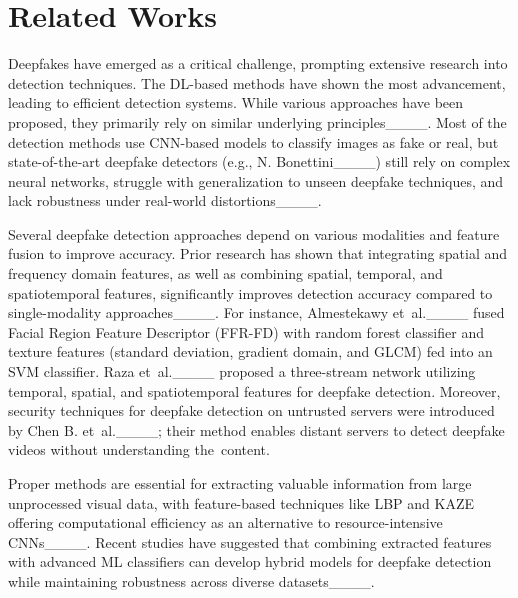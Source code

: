 \section{Related Works}
\label{sec:impact}

Deepfakes have emerged as a critical challenge, prompting extensive research into detection techniques. The DL-based methods have shown the most advancement, leading to efficient detection systems. While various approaches have been proposed, they primarily rely on similar underlying principles____. 
Most of the detection methods use CNN-based models to classify images as fake or real, but state-of-the-art deepfake detectors (e.g., N. Bonettini____) still rely on complex neural networks, struggle with generalization to unseen deepfake techniques, and lack robustness under real-world distortions____.

Several deepfake detection approaches depend on various modalities and feature fusion to improve accuracy. Prior research has shown that integrating spatial and frequency domain features, as well as combining spatial, temporal, and spatiotemporal features, significantly improves detection accuracy compared to single-modality approaches____. For instance, Almestekawy et~al.____ fused Facial Region Feature Descriptor (FFR-FD) with random forest classifier and texture features (standard deviation, gradient domain, and GLCM) fed into an SVM classifier. Raza et~al.____ proposed a three-stream network utilizing temporal, spatial, and spatiotemporal features for deepfake detection. Moreover, security techniques for deepfake detection on untrusted servers were introduced by Chen B. et~al.____; their method enables distant servers to detect deepfake videos without understanding the~\mbox{content}.

Proper methods are essential for extracting valuable information from large unprocessed visual data, with feature-based techniques like LBP and KAZE offering computational efficiency as an alternative to resource-intensive CNNs____. Recent studies have suggested that combining extracted features with advanced ML classifiers can develop hybrid models for deepfake detection while maintaining robustness across diverse datasets____. 

